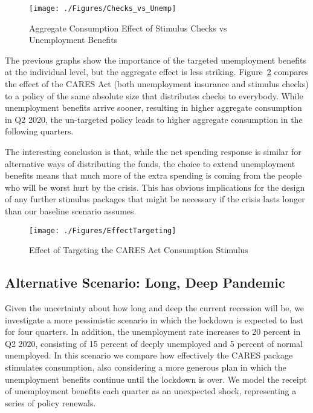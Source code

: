 \documentclass[titlepage,letterpaper]{\econtex}
\begin{document}
\begin{figure}
  \centering
  \caption{Aggregate Consumption Effect of Stimulus Checks vs Unemployment Benefits}
  \label{checks_vs_unemp}
  { \texttt{[image: ./Figures/Checks\_vs\_Unemp]}}
\end{figure}

The previous graphs show the importance of the targeted unemployment benefits at the individual level, but the aggregate effect is less striking.
Figure~\ref{EffectTargeting} compares the effect of the CARES Act (both unemployment insurance and stimulus checks) to a policy of the same absolute size that distributes checks to everybody.
While unemployment benefits arrive sooner, resulting in higher aggregate consumption in Q2 2020, the un-targeted policy leads to higher aggregate consumption in the following quarters.

The interesting conclusion is that, while the net spending response is similar for alternative ways of distributing the funds, the choice to extend unemployment benefits means that much more of the extra spending is coming from the people who will be worst hurt by the crisis.  This has obvious implications for the design of any further stimulus packages that might be necessary if the crisis lasts longer than our baseline scenario assumes.

\begin{figure}
  \centering
  \caption{Effect of Targeting the CARES Act Consumption Stimulus}
  \label{EffectTargeting}
  { \texttt{[image: ./Figures/EffectTargeting]}}
\end{figure}


\subsection{Alternative Scenario: Long, Deep Pandemic} \label{sec:longPandemic}

Given the uncertainty about how long and deep the current recession will be, we investigate a more pessimistic scenario in which the lockdown is expected to last for four quarters.
In addition, the unemployment rate increases to 20 percent in Q2 2020, consisting of 15 percent of deeply unemployed and 5 percent of normal unemployed.
In this scenario we compare how effectively the CARES package stimulates consumption, also considering a more generous plan in which the unemployment benefits continue until the lockdown is over.
We model the receipt of unemployment benefits each quarter as an unexpected shock, representing a series of policy renewals.
\end{document}
